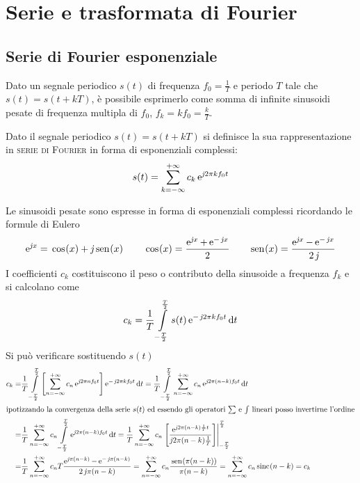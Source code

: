 \chapter{Serie e trasformata di Fourier}

\section{Serie di Fourier esponenziale}
Dato un segnale periodico $s(t)$ di frequenza $f_0=\frac{1}{T}$ e periodo $T$ tale che $s(t)=s(t+k T)$, è possibile esprimerlo come somma di infinite sinusoidi pesate di frequenza multipla di $f_0$, $f_k=k f_0=\frac{k}{T}$.

\begin{definizione}
Dato il segnale periodico $s(t)=s(t+k T)$ si definisce la sua rappresentazione in \textsc{serie di Fourier} in forma di esponenziali complessi:
\begin{equation}\label{eq:serie_fourier}\index{Fourier!serie}
s(t)=\sum_{k=-\infty}^{+\infty} c_k \e{\imath 2\pi k f_0 t}
\end{equation}
\end{definizione}
Le sinusoidi pesate sono espresse in forma di esponenziali complessi ricordando le formule di Eulero
\begin{equation}\e{\imath x}=\cos{x}+\imath\sen{x}\qquad\cos{x}=\frac{\e{\imath x}+\e{-\imath x}}{2}\qquad\sen{x}=\frac{\e{\imath x}-\e{-\imath x}}{2\imath}\end{equation}
I coefficienti $c_k$ costituiscono il peso o contributo della sinusoide a frequenza $f_k$ e si calcolano come
\begin{equation}\label{eq:serie_fourier_coef}\index{Fourier!coefficienti serie}
c_k=\frac{1}{T}\intd{-\frac{T}{2}}{\frac{T}{2}}{s(t)\e{-\imath 2\pi k f_0 t}}{t}
\end{equation}
Si può verificare sostituendo $s(t)$
\begin{align*}
c_k=&\frac{1}{T}\intd{-\frac{T}{2}}{\frac{T}{2}}{ \left[\sum_{n=-\infty}^{+\infty} c_n \e{\imath 2\pi n f_0 t}\right] \e{-\imath 2\pi k f_0 t}}{t} 
=\frac{1}{T}\intd{-\frac{T}{2}}{\frac{T}{2}}{ \sum_{n=-\infty}^{+\infty} c_n \e{\imath 2\pi (n-k) f_0 t} }{t} \\
\intertext{ipotizzando la convergenza della serie $s(t)$ ed essendo gli operatori $\sum$ e $\int$ lineari posso invertirne l'ordine} 
=&\frac{1}{T}\sum_{n=-\infty}^{+\infty} c_n \intd{-\frac{T}{2}}{\frac{T}{2}}{\e{\imath 2\pi(n-k)f_0 t}}{t}
=\frac{1}{T}\sum_{n=-\infty}^{+\infty} c_n \bound{-\frac{T}{2}}{\frac{T}{2}}{\frac{\e{\imath 2\pi(n-k)\frac{1}{T}t}}{\imath 2\pi(n-k)\frac{1}{T} }}\\
=&\frac{1}{T}\sum_{n=-\infty}^{+\infty} c_n T \frac{\e{\imath \pi(n-k)}-\e{-\imath\pi(n-k)}}{2\imath\pi(n-k)}
=\sum_{n=-\infty}^{+\infty} c_n \frac{\sen{\pi(n-k)}}{\pi(n-k)}
=\sum_{n=-\infty}^{+\infty} c_n \sinc{n-k} = c_k
\end{align*}
